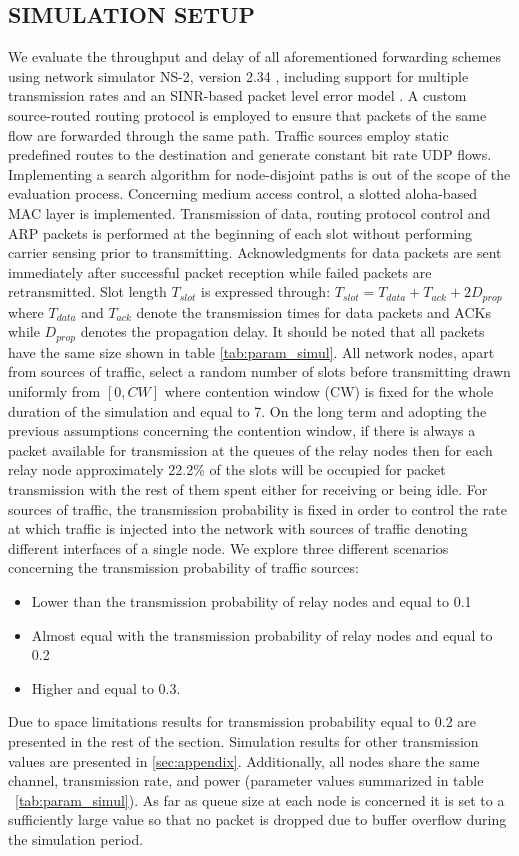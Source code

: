 \documentclass[journal, onecolumn, 12pt]{IEEEtran}
\begin{document}
\subsection{\uppercase{Simulation Setup}}
\label{sec:sim_setup}
We evaluate the throughput and delay of all aforementioned forwarding schemes  using network simulator NS-2, version 2.34 \cite{ref:ns2}, including support for multiple transmission rates and an SINR-based packet
level error model \cite{ref:dei80211mr}.
A custom source-routed routing protocol is employed to ensure that packets of the same flow are forwarded through the same path.
Traffic sources employ static predefined routes to the destination and generate constant bit rate UDP flows.
Implementing a search algorithm for node-disjoint paths is out of the scope of the evaluation process.
Concerning medium access control, a slotted aloha-based MAC layer is implemented.
Transmission of data, routing protocol control and ARP packets is performed at the beginning of each slot without performing carrier sensing prior to transmitting.
Acknowledgments for data packets are sent immediately after successful packet reception while failed packets are retransmitted.
Slot length $T_{slot}$ is expressed through: $T_{slot} = T_{data} + T_{ack} + 2D_{prop}$ where $T_{data}$ and $T_{ack}$ denote the transmission times for data packets and ACKs while $D_{prop}$ denotes the propagation delay.
It should be noted that all packets have the same size shown in table \ref{tab:param_simul}.
All network nodes, apart from sources of traffic, select a random number of slots before transmitting drawn uniformly from $[0,CW]$ where contention window (CW) is fixed for the whole duration of the simulation and equal to 7.
On the long term and adopting the previous assumptions concerning the contention window, if there is always a packet available for transmission at the queues of the relay nodes then for each relay node approximately 22.2\% of the slots will be occupied for packet transmission
with the rest of them spent either for receiving or being idle.
For sources of traffic, the transmission probability is fixed in order to control the rate at which traffic is injected into the network with sources of traffic denoting different
interfaces of a single node.
We explore three different scenarios concerning the transmission probability of traffic sources:
\begin{itemize}
\item Lower than the transmission probability of relay nodes and equal to 0.1
\item Almost equal with the transmission probability of relay nodes and equal to 0.2
\item Higher and equal to 0.3.
\end{itemize}
Due to space limitations results for transmission probability equal to $0.2$ are presented in the rest of the section.
Simulation results for other transmission values are presented in \ref{sec:appendix}.
Additionally, all nodes share the same channel, transmission rate, and power (parameter values summarized in table ~\ref{tab:param_simul}).
As far as queue size at each node is concerned it is set to a sufficiently large value so that no packet is dropped due to buffer overflow during the simulation period.
\end{document}
